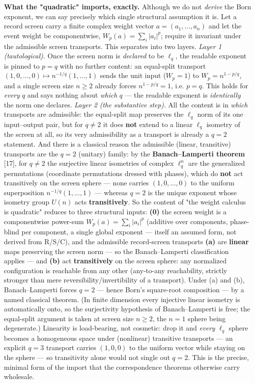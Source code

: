 \documentclass[11pt]{article}
\begin{document}
\textbf{What the "quadratic" imports, exactly.}  Although we do not \emph{derive} the Born exponent, we can say precisely which single structural assumption it is.  Let a record screen carry a finite complex weight vector $a = (a_1, \dots, a_n)$ and let the event weight be componentwise, $W_p(a) = \sum_i |a_i|^p$; require it invariant under the admissible screen transports.  This separates into two layers.  \emph{Layer 1 (tautological).}  Once the screen norm is \emph{declared} to be $\ell_q$, the readable exponent is pinned to $p = q$ with no further content: an equal-split transport $(1,0,\dots,0) \mapsto n^{-1/q}(1,\dots,1)$ sends the unit input ($W_p = 1$) to $W_p = n^{1-p/q}$, and a single screen size $n \ge 2$ already forces $n^{1-p/q} = 1$, i.e. $p = q$.  This holds for \emph{every} $q$ and says nothing about \emph{which} $q$ — the readable exponent is \emph{identically} the norm one declares.  \emph{Layer 2 (the substantive step).}  All the content is in \emph{which} transports are admissible: the equal-split map preserves the $\ell_q$ norm of its one input–output pair, but for $q \neq 2$ it does \textbf{not} extend to a linear $\ell_q$ isometry of the screen at all, so its very admissibility as a transport is already a $q = 2$ statement.  And there is a classical reason the admissible (linear, transitive) transports are the $q = 2$ (unitary) family: by the \textbf{Banach–Lamperti theorem} [17], for $q \neq 2$ the surjective linear isometries of complex $\ell^n_q$ are the generalized permutations (coordinate permutations dressed with phases), which do \textbf{not} act transitively on the screen sphere — none carries $(1,0,\dots,0)$ to the uniform superposition $n^{-1/q}(1,\dots,1)$ — whereas $q = 2$ is the unique exponent whose isometry group $U(n)$ acts \textbf{transitively}.  So the content of "the weight calculus is quadratic" reduces to three structural inputs: \textbf{(0)} the screen weight is a componentwise power-sum $W_p(a) = \sum_i |a_i|^p$ (additive over components, phase-blind per component, a single global exponent — itself an assumed form, not derived from R/S/C), and the admissible record-screen transports \textbf{(a)} are \textbf{linear} maps preserving the screen norm — so the Banach–Lamperti classification applies — and \textbf{(b)} act \textbf{transitively} on the screen sphere: any normalized configuration is reachable from any other (any-to-any reachability, strictly stronger than mere reversibility/invertibility of a transport).  Under (a) and (b), Banach–Lamperti forces $q = 2$ — hence Born's square-root composition — by a named classical theorem. (In finite dimension every injective linear isometry is automatically onto, so the surjectivity hypothesis of Banach–Lamperti is free; the equal-split argument is taken at screen size $n \ge 2$, the $n = 1$ sphere being degenerate.)  Linearity is load-bearing, not cosmetic: drop it and \emph{every} $\ell_q$ sphere becomes a homogeneous space under (nonlinear) transitive transports — an explicit $q = 3$ transport carries $(1,0,0)$ to the uniform vector while staying on the sphere — so transitivity alone would not single out $q = 2$.  This is the precise, minimal form of the import that the correspondence theorems otherwise carry wholesale.
\end{document}
